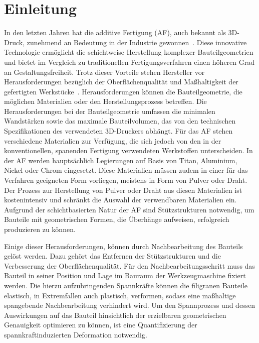 \chapter{Einleitung}

In den letzten Jahren hat die additive Fertigung (AF), auch bekannt als 3D-Druck, 
zunehmend an Bedeutung in der Industrie gewonnen~\cite{JADHAV20222094}. 
Diese innovative Technologie 
ermöglicht die schichtweise Herstellung komplexer Bauteilgeometrien und bietet im 
Vergleich zu traditionellen Fertigungsverfahren einen höheren Grad an 
Gestaltungsfreiheit. Trotz dieser Vorteile stehen Hersteller vor 
Herausforderungen bezüglich der Oberflächenqualität und Maßhaltigkeit 
der gefertigten Werkstücke~\cite{SCHNECK201919}.
Herausforderungen können die Bauteilgeometrie, die möglichen Materialien oder 
den Herstellungsprozess betreffen.
Die Herausforderungen bei der Bauteilgeometrie umfassen die minimalen 
Wandstärken sowie das maximale Bauteilvolumen, das von den technischen 
Spezifikationen des verwendeten 3D-Druckers abhängt. Für das AF stehen 
verschiedene Materialien zur Verfügung, 
die sich jedoch von den in der konventionellen, spanenden Fertigung 
verwendeten Werkstoffen unterscheiden. In der AF werden hauptsächlich Legierungen 
auf Basis von Titan, Aluminium, Nickel oder Chrom eingesetzt. Diese Materialien
müssen zudem in einer für das Verfahren geeigneten Form vorliegen, 
meistens in Form von Pulver oder Draht. Der Prozess zur Herstellung von 
Pulver oder Draht aus diesen Materialien ist kostenintensiv und schränkt
die Auswahl der verwendbaren Materialien ein. Aufgrund der 
schichtbasierten Natur der AF sind Stützstrukturen 
notwendig, um Bauteile mit geometrischen Formen, die Überhänge aufweisen, 
erfolgreich produzieren zu können. \label{drawbacks_af}
\cite{Vranic.2017}

Einige dieser Herausforderungen, können durch Nachbearbeitung des Bauteils 
gelöst werden. Dazu gehört das Entfernen der Stützstrukturen und die Verbesserung
der Oberflächenqualität.
Für den Nachbearbeitungsschritt muss das Bauteil in seiner Position und Lage im Bauraum
der Werkzeugmaschine fixiert werden. Die hierzu aufzubringenden Spannkräfte 
können die filigranen Bauteile elastisch, in Extremfallen auch plastisch, verformen, 
sodass eine maßhaltige spangebende Nachbearbeitung verhindert wird. 
Um den Spannprozess und dessen Auswirkungen auf das Bauteil hinsichtlich 
der erzielbaren geometrischen Genauigkeit optimieren zu
können, ist eine Quantifizierung der spannkraftinduzierten Deformation notwendig.~\cite{newMethod}

